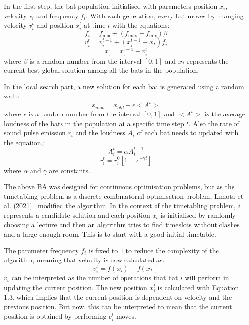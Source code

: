 \documentclass[a4paper, 12pt]{report}
\begin{document}
In the first step, the bat population initialised with parameters position
\( x_i \), velocity \( v_i \) and frequency \( f_i \).
With each generation, every bat moves by changing velocity \( v_i^t \) and 
position \( x_i^t \) at time \( t \) with the equations:
\begin{equation}
	f_i = f_{\min} + (f_{\max} - f_{\min}) \beta
\end{equation}
\begin{equation}
	v_i^t = v_i^{t-1} + (x_i^{t-1} - x_*) f_i
\end{equation}
\begin{equation}
	x_i^t = x_i^{t-1} + v_i^t
\end{equation}
where \( \beta \) is a random number from the interval \( [0,1] \) and \( x_* \)
represents the current best global solution among all the bats in the
population.

In the local search part, a new solution for each bat is generated using a
random walk:
\begin{equation*}
	x_{new} = x_{old} + \epsilon < A^t >
\end{equation*}
where \( \epsilon \) is a random number from the interval \( [0,1] \) and
\( < A^t > \) is the average loudness of the bats in the population at a
specific time step \( t \).
Also the rate of sound pulse emission \( r_i \) and the loudness \( A_i \) of 
each bat needs to updated with the equation,:
\begin{equation*}
	A_i^t = \alpha A_i^{t-1}
\end{equation*}
\begin{equation*}
	r_i^t = r_i^0 [1 - e^{-\gamma t}]
\end{equation*}
where \( \alpha \) and \( \gamma \) are constants.

The above BA was designed for continuous optimisation problems, but as the
timetabling problem is a discrete combinatorial optimisation problem, Limota et
al. (2021)~\cite{ba_example} modified the algorithm.
In the context of the timetabling problem, \( i \) represents a candidate 
solution and each position \( x_i \) is initialised by randomly choosing a
lecture and then an algorithm tries to find timeslots without clashes and a 
large enough room. This is to start with a good initial timetable.

The parameter frequency \( f_i \) is fixed to \( 1 \) to reduce the complexity 
of the algorithm, meaning that velocity is now calculated as:
\begin{equation*}
	v_i^t = f(x_i) - f(x_*)
\end{equation*}
\( v_i \) can be interpreted as the number of operations that bat \( i \) will 
perform in updating the current position. The new position \( x_i^t \) is
calculated with Equation 1.3, which implies that the current position is
dependent on velocity and the previous position. But now, this can be 
interpreted to mean that the current position is obtained by performing 
\( v_i^t \) moves.
\end{document}
